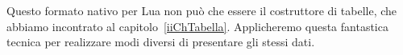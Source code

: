 Questo formato nativo per Lua non può che essere il costruttore di tabelle, che
abbiamo incontrato al capitolo~\ref{iiChTabella}. Applicheremo questa fantastica
tecnica per realizzare modi diversi di presentare gli stessi dati.














